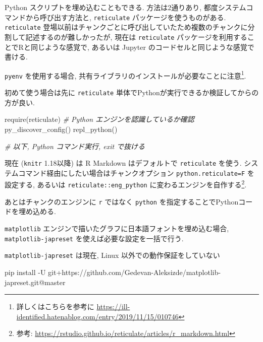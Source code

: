 \documentclass[
]{bxjsbook}
\newenvironment{Shaded}{\begin{snugshade}}{\end{snugshade}}
\newcommand{\CommentTok}[1]{\textcolor[rgb]{0.56,0.35,0.01}{\textit{#1}}}
\newcommand{\ExtensionTok}[1]{#1}
\newcommand{\FunctionTok}[1]{\textcolor[rgb]{0.00,0.00,0.00}{#1}}
\newcommand{\NormalTok}[1]{#1}
\newenvironment{infobox}[1]{\begin{itemize}\renewcommand{\labelitemi}{\raisebox{-.7\height}[0pt][0pt]{%
  {\setkeys{Gin}{width=3em,keepaspectratio}\texttt{[image: \_latex/\_img/\#1]}}}}
  \setlength{\fboxsep}{1em}
  \begin{greyblock}
  \item
  }{\end{greyblock}\end{itemize}
}
\newenvironment{warning}{\begin{infobox}{warning}}{\end{infobox}}
\theoremstyle{definition}
\theoremstyle{definition}
\theoremstyle{definition}
\theoremstyle{remark}
\begin{document}
Python スクリプトを埋め込むこともできる. 方法は2通りあり,
都度システムコマンドから呼び出す方法と, \texttt{reticulate}
パッケージを使うものがある. \texttt{reticulate}
登場以前はチャンクごとに呼び出していたため複数のチャンクに分割して記述するのが難しかったが,
現在は \texttt{reticulate}
パッケージを利用することでRと同じような感覚で, あるいは Jupyter
のコードセルと同じような感覚で書ける.

\texttt{pyenv} を使用する場合,
共有ライブラリのインストールが必要なことに注意\footnote{詳しくはこちらを参考に
  \url{https://ill-identified.hatenablog.com/entry/2019/11/15/010746}}.

初めて使う場合は先に \texttt{reticulate}
単体でPythonが実行できるか検証してからの方が良い.

\begin{Shaded}
\begin{Highlighting}[numbers=left,,]
\FunctionTok{require}\NormalTok{(reticulate)}
\CommentTok{\# Python エンジンを認識しているか確認}
\FunctionTok{py\_discover\_config}\NormalTok{()}
\FunctionTok{repl\_python}\NormalTok{()}

\CommentTok{\# 以下, Python コマンド実行, \textasciigrave{}exit\textasciigrave{} で抜ける}
\end{Highlighting}
\end{Shaded}

現在 (\texttt{knitr} 1.18以降) は R Markdown はデフォルトで
\texttt{reticulate} を使う.
システムコマンド経由にしたい場合はチャンクオプション
\texttt{python.reticulate=F} を設定する, あるいは
\texttt{reticulate::eng\_python} に変わるエンジンを自作する\footnote{参考:
  \url{https://rstudio.github.io/reticulate/articles/r_markdown.html}}.

あとはチャンクのエンジンに \texttt{r} ではなく \texttt{python}
を指定することでPythonコードを埋め込める.

\texttt{matplotlib}
エンジンで描いたグラフに日本語フォントを埋め込む場合,
\texttt{matplotlib-japreset} を使えば必要な設定を一括で行う.

\begin{warning}
\texttt{matplotlib-japreset} は現在, Linux 以外での動作保証をしていない
\end{warning}

\begin{Shaded}
\begin{Highlighting}[]
\ExtensionTok{pip}\NormalTok{ install {-}U git+https://github.com/Gedevan{-}Aleksizde/matplotlib{-}japreset.git@master}
\end{Highlighting}
\end{Shaded}
\end{document}
